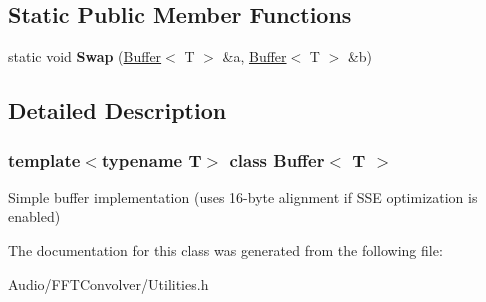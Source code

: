 \subsection*{Static Public Member Functions}
\begin{DoxyCompactItemize}
\item 
\mbox{\label{class_buffer_ae7b6b5c53d769b224d5c422b6a5c7c5c}} 
static void {\bfseries Swap} (\hyperlink{class_buffer}{Buffer}$<$ T $>$ \&a, \hyperlink{class_buffer}{Buffer}$<$ T $>$ \&b)
\end{DoxyCompactItemize}


\subsection{Detailed Description}
\subsubsection*{template$<$typename T$>$\newline
class Buffer$<$ T $>$}

Simple buffer implementation (uses 16-\/byte alignment if S\+SE optimization is enabled) 

The documentation for this class was generated from the following file\+:\begin{DoxyCompactItemize}
\item 
Audio/\+F\+F\+T\+Convolver/Utilities.\+h\end{DoxyCompactItemize}
